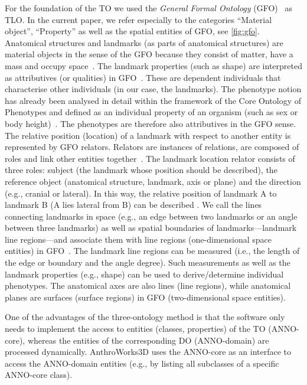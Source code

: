 \documentclass[sw]{iosart2x}
\newcommand{\aw}{AnthroWorks3D}
\begin{document}
For the foundation of the TO we used the \emph{General Formal Ontology} (GFO)~\citep{gfo} as TLO.
In the current paper, we refer especially to the categories \enquote{Material object}, \enquote{Property} as well as the spatial entities of GFO, see \cref{fig:gfo}.
Anatomical structures and landmarks (as parts of anatomical structures) are material objects in the sense of the GFO because they consist of matter, have a mass and occupy space~\citep{gfospace}.
The landmark properties (such as shape) are interpreted as attributives (or qualities) in GFO~\citep{gfoarchitecture}.
These are dependent individuals that characterise other individuals (in our case, the landmarks).
The phenotype notion has already been analysed in detail within the framework of the Core Ontology of Phenotypes and defined as an individual property of an organism (such as sex or body height)~\citep{ontologicalrepresentation}.
The phenotypes are therefore also attributives in the GFO sense.
The relative position (location) of a landmark with respect to another entity is represented by GFO relators.
Relators are instances of relations, are composed of roles and link other entities together~\citep{gfocategory}.
The landmark location relator consists of three roles: subject (the landmark whose position should be described), the reference object (anatomical structure, landmark, axis or plane) and the direction (e.g., cranial or lateral).
In this way, the relative position of landmark A to landmark B (A lies lateral from B) can be described .
We call the lines connecting landmarks in space (e.g., an edge between two landmarks or an angle between three landmarks) as well as spatial boundaries of
landmarks---landmark line regions---and associate them with line regions (one-dimensional space entities) in GFO~\citep{gfospace}.
The landmark line regions can be measured (i.e., the length of the edge or boundary and the angle degree).
Such measurements as well as the landmark properties (e.g., shape) can be used to derive/determine individual phenotypes.
The anatomical axes are also lines (line regions), while anatomical planes are surfaces (surface regions) in GFO (two-dimensional space entities).


One of the advantages of the three-ontology method is that the software only needs to implement the access to entities (classes, properties) of the TO (ANNO-core),
whereas the entities of the corresponding DO (ANNO-domain) are processed dynamically.
\aw{} uses the ANNO-core as an interface to access the ANNO-domain entities (e.g., by listing all subclasses of a specific ANNO-core class).
\end{document}
